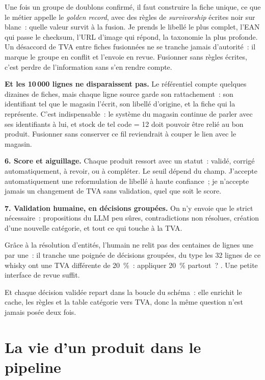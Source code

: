 \documentclass[11pt,a4paper]{article}
\begin{document}
Une fois un groupe de doublons confirmé, il faut construire la fiche unique, ce que le métier
appelle le \emph{golden record}, avec des règles de \emph{survivorship} écrites noir sur blanc~:
quelle valeur survit à la fusion. Je prends le libellé le plus complet, l'EAN qui passe le
checksum, l'URL d'image qui répond, la taxonomie la plus profonde. Un désaccord de TVA entre fiches
fusionnées ne se tranche jamais d'autorité~: il marque le groupe en conflit et l'envoie en revue.
Fusionner sans règles écrites, c'est perdre de l'information sans s'en rendre compte.

\textbf{Et les 10\,000 lignes ne disparaissent pas.} Le référentiel compte quelques dizaines de
fiches, mais chaque ligne source garde son rattachement~: son identifiant tel que le magasin
l'écrit, son libellé d'origine, et la fiche qui la représente. C'est indispensable~: le système du
magasin continue de parler avec ses identifiants à lui, et \guillemotleft{} stock de tel code = 12 \guillemotright{} doit pouvoir
être relié au bon produit. Fusionner sans conserver ce fil reviendrait à couper le lien avec le
magasin.

\textbf{6. Score et aiguillage.} Chaque produit ressort avec un statut~: validé, corrigé
automatiquement, à revoir, ou à compléter. Le seuil dépend du champ. J'accepte automatiquement une
reformulation de libellé à haute confiance~; je n'accepte jamais un changement de TVA sans
validation, quel que soit le score.

\textbf{7. Validation humaine, en décisions groupées.} On n'y envoie que le strict nécessaire~:
propositions du LLM peu sûres, contradictions non résolues, création d'une nouvelle catégorie, et
tout ce qui touche à la TVA.

Grâce à la résolution d'entités, l'humain ne relit pas des centaines de lignes une par une~: il
tranche une poignée de décisions groupées, du type \guillemotleft{} les 32 lignes de ce whisky ont une TVA
différente de 20~\%~: appliquer 20~\% partout~? \guillemotright{}. Une petite interface de revue suffit.

Et chaque décision validée repart dans la boucle
du schéma~: elle enrichit le cache, les règles et la table catégorie vers TVA, donc la même
question n'est jamais posée deux fois.

\section*{La vie d'un produit dans le pipeline}
\end{document}
